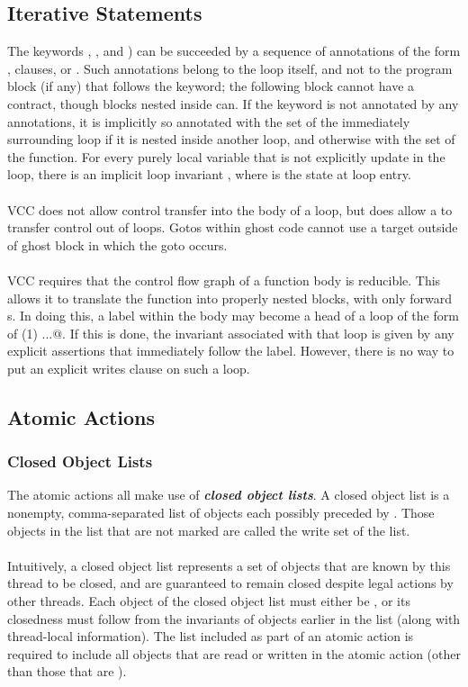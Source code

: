 \documentclass[preprint,nocopyrightspace]{sigplanconf}
\newcommand{\Def}[1]{\textit{\textbf{#1}}}
\begin{document}
{{{\subsection{Iterative Statements}
The keywords , , and ) 
can be succeeded by a sequence of annotations of the form 
,  clauses, or 
. Such annotations belong to the loop itself, and
not to the program block (if any) that follows the keyword; the
following block cannot have a contract, though blocks nested inside
can. If the keyword is not annotated by any  annotations,
it is implicitly so annotated with the  set of the
immediately surrounding loop if it is nested inside another loop, and
otherwise with the  set of the function. For every
purely local variable  that is not explicitly update in the
loop, there is an implicit loop invariant ,
where  is the state at loop entry.
\\\\
VCC does not allow control transfer into the body of a loop, but does
allow a  to transfer control out of loops.
Gotos within ghost code cannot use a target outside of
ghost block in which the goto occurs.
\\\\
VCC requires that the control flow graph of a function body is
reducible. This allows it to translate the function into properly
nested blocks, with only forward s. In doing this, a label
within the body may become a head of a loop of the form of 
\vcc@while (1) {...}@. If this is done, the invariant associated with that loop is
given by any explicit assertions that immediately follow the label.
However, there is no way to put an explicit writes clause on such a
loop.

\subsection{Atomic Actions}

\subsubsection{Closed Object Lists}
The atomic actions all make use of \Def{closed object lists}. A closed
object list is a nonempty, comma-separated list of objects
each possibly preceded by . Those objects in the list
that are not marked  are called the write set of the list.
\\\\
Intuitively, a closed object list represents a set of objects that are
known by this thread to be closed, and are guaranteed to remain closed
despite legal actions by other threads. Each object of the closed
object list must either be \vcc{\wrapped}, or its closedness must
follow from the invariants of objects earlier in the list (along with
thread-local information). The list included as part of an atomic
action is required to include all objects that are read or written in
the atomic action (other than those that are \vcc{\mutable}). 

}}}
\end{document}
